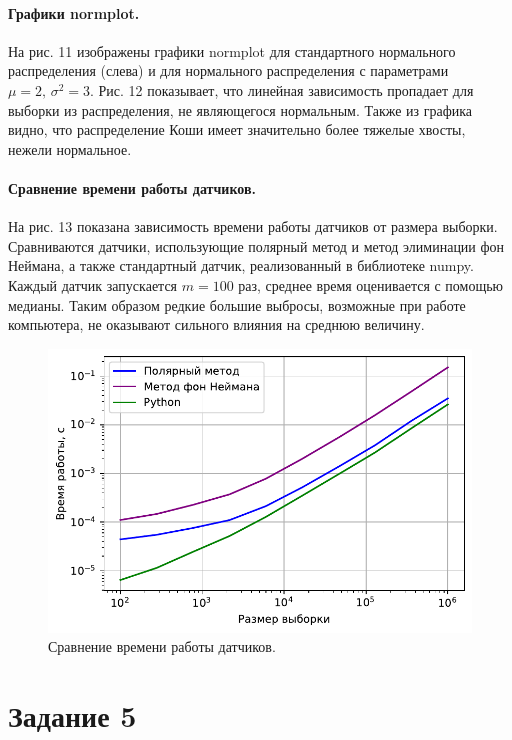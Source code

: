 \documentclass[16pt]{article}
\begin{document}
\paragraph{Графики normplot.} На рис. 11 изображены графики normplot для стандартного нормального распределения (слева) и для нормального распределения с параметрами $\mu = 2,\, \sigma^2 = 3$. Рис. 12 показывает, что линейная зависимость пропадает для выборки из распределения, не являющегося нормальным. Также из графика видно, что распределение Коши имеет значительно более тяжелые хвосты, нежели нормальное.

\paragraph{Сравнение времени работы датчиков.} На рис. 13 показана зависимость времени работы датчиков  от размера выборки. Сравниваются датчики, использующие полярный метод и метод элиминации фон Неймана, а также стандартный датчик, реализованный в библиотеке numpy. Каждый датчик запускается $m = 100$  раз, среднее время оценивается с помощью медианы. Таким образом редкие большие выбросы, возможные при работе компьютера, не оказывают сильного влияния на среднюю величину.

\begin{figure}[h]
	\center
	\includegraphics[scale=0.7]{4_5.pdf}
	\caption{Сравнение времени работы датчиков.}
\end{figure}

\newpage
\section{Задание 5}
\end{document}
